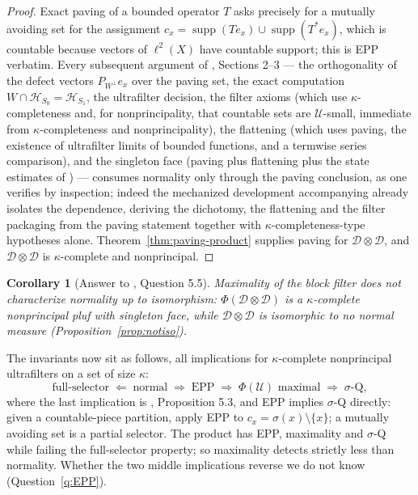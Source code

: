 \documentclass[11pt]{article}
\newtheorem{corollary}[theorem]{Corollary}
\theoremstyle{definition}
\newcommand{\HH}{\mathcal{H}}
\newcommand{\U}{\mathcal{U}}
\newcommand{\D}{\mathcal{D}}
\newcommand{\supp}{\operatorname{supp}}
\begin{document}
\begin{proof}
Exact paving of a bounded operator $T$ asks precisely for a mutually
avoiding set for the assignment
$c_x=\supp(Te_x)\cup\supp(T^*e_x)$, which is countable because vectors of
$\ell^2(X)$ have countable support; this is EPP verbatim. Every subsequent
argument of \cite{FWIII}, Sections 2--3 --- the orthogonality of the
defect vectors $P_{W^\perp}e_x$ over the paving set, the exact
computation $W\cap\HH_{S_0}=\HH_{S_1}$, the ultrafilter decision, the
filter axioms (which use $\kappa$-completeness and, for nonprincipality,
that countable sets are $\U$-small, immediate from $\kappa$-completeness
and nonprincipality), the flattening (which uses paving, the existence of
ultrafilter limits of bounded functions, and a termwise series
comparison), and the singleton face (paving plus flattening plus the
state estimates of \cite{FWI}) --- consumes normality only through the
paving conclusion, as one verifies by inspection; indeed the mechanized
development accompanying \cite{FWIII} already isolates the dependence,
deriving the dichotomy, the flattening and the filter packaging from the
paving statement together with $\kappa$-completeness-type hypotheses
alone. Theorem~\ref{thm:paving-product} supplies paving for
$\D\otimes\D$, and $\D\otimes\D$ is $\kappa$-complete and nonprincipal.
\end{proof}

\begin{corollary}[Answer to {\cite{FWIII}}, Question 5.5]
\label{cor:answer}
Maximality of the block filter does not characterize normality up to
isomorphism: $\Phi(\D\otimes\D)$ is a $\kappa$-complete nonprincipal pluf
with singleton face, while $\D\otimes\D$ is isomorphic to no normal
measure (Proposition~\ref{prop:notiso}).
\end{corollary}

The invariants now sit as follows, all implications for
$\kappa$-complete nonprincipal ultrafilters on a set of size $\kappa$:
\[
\text{full-selector}\;\Longleftarrow\;\text{normal}
\;\Longrightarrow\;\text{EPP}
\;\Longrightarrow\;\text{$\Phi(\U)$ maximal}
\;\Longrightarrow\;\text{$\sigma$-Q},
\]
where the last implication is \cite{FWIII}, Proposition 5.3, and EPP
implies $\sigma$-Q directly: given a countable-piece partition, apply EPP
to $c_x=\sigma(x)\setminus\{x\}$; a mutually avoiding set is a partial
selector. The product has EPP, maximality and $\sigma$-Q while failing
the full-selector property; so maximality detects strictly less than
normality. Whether the two middle implications reverse we do not know
(Question~\ref{q:EPP}).
\end{document}

